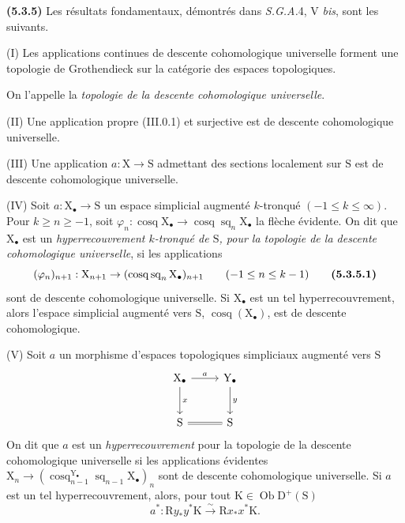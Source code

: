 \documentclass[11pt,leqno]{article}
\begin{document}
\textbf{(5.3.5)} Les résultats fondamentaux, démontrés dans \textit{S.G.A.}4, V \textit{bis}, sont les suivants.

(I) Les applications continues de descente cohomologique universelle forment une topologie de Grothendieck sur la catégorie des espaces topologiques.

On l’appelle la \textit{topologie de la descente cohomologique universelle}.

(II) Une application propre (III.0.1) et surjective est de descente cohomologique universelle.

(III) Une application \(a:\mathrm{X}\to\mathrm{S}\) admettant des sections localement sur \(\mathrm{S}\) est de descente cohomologique universelle.

(IV) Soit \(a:\mathrm{X}_{\bullet}\to\mathrm{S}\) un espace simplicial augmenté \(k\)-tronqué \((-1\leq k\leq\infty)\). Pour \(k\geq n\geq-1\), soit \(\varphi_n:\operatorname{cosq}\mathrm{X}_{\bullet}\to\operatorname{cosq}\operatorname{sq}_n\mathrm{X}_{\bullet}\) la flèche évidente. On dit que \(\mathrm{X}_{\bullet}\) est un \textit{hyperrecouvrement \(k\)-tronqué de \(\mathrm{S}\), pour la topologie de la descente cohomologique universelle}, si les applications
\[
(\varphi_n)_{n+1}:\mathrm{X}_{n+1}
\to(\operatorname{cosq}\operatorname{sq}_n\mathrm{X}_{\bullet})_{n+1}
\qquad(-1\leq n\leq k-1)
\tag*{\textbf{(5.3.5.1)}}
\]
sont de descente cohomologique universelle. Si \(\mathrm{X}_{\bullet}\) est un tel hyperrecouvrement, alors l’espace simplicial augmenté vers \(\mathrm{S}\), \(\operatorname{cosq}(\mathrm{X}_{\bullet})\), est de descente cohomologique.

(V) Soit \(a\) un morphisme d’espaces topologiques simpliciaux augmenté vers \(\mathrm{S}\)
\[
\begin{tikzcd}[column sep=2.5em,row sep=2.5em]
\mathrm{X}_{\bullet}\arrow[r,"a"]\arrow[d,"x"]
  & \mathrm{Y}_{\bullet}\arrow[d,"y"]\\
\mathrm{S}\arrow[r,equal] & \mathrm{S}
\end{tikzcd}
\]
On dit que \(a\) est un \textit{hyperrecouvrement} pour la topologie de la descente cohomologique universelle si les applications évidentes \(\mathrm{X}_n\to(\operatorname{cosq}_{n-1}^{\mathrm{Y}_{\bullet}}\operatorname{sq}_{n-1}\mathrm{X}_{\bullet})_n\) sont de descente cohomologique universelle. Si \(a\) est un tel hyperrecouvrement, alors, pour tout \(\mathrm{K}\in\operatorname{Ob}\mathrm{D}^{+}(\mathrm{S})\)
\[
a^*:\mathrm{R}y_*y^*\mathrm{K}\xrightarrow{\sim}\mathrm{R}x_*x^*\mathrm{K}.
\]
\end{document}
